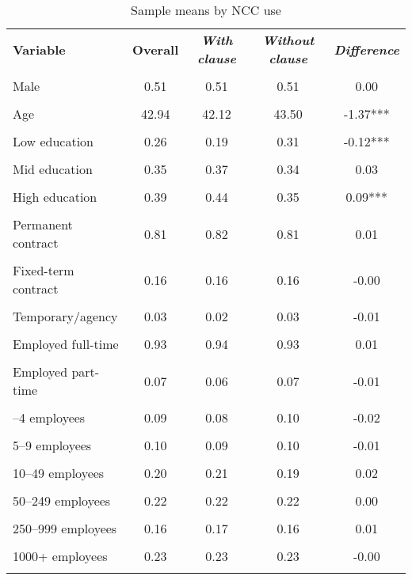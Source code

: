 \begin{table}[!ht]\centering
\caption{Sample means by NCC use}
\label{tab:sample_means_ncc_Portugal} %
\begin{tabular}{lcccc}\toprule
\textbf{Variable} & \textbf{Overall} & \textbf{\textit{With clause}} & \textbf{\textit{Without clause}} & \textbf{\textit{Difference}} \\\\ \midrule
Male & 0.51 & 0.51 & 0.51 & 0.00 \\\\
Age & 42.94 & 42.12 & 43.50 & -1.37*** \\\\
\addlinespace
Low education & 0.26 & 0.19 & 0.31 & -0.12*** \\\\
Mid education & 0.35 & 0.37 & 0.34 & 0.03 \\\\
High education & 0.39 & 0.44 & 0.35 & 0.09*** \\\\
\addlinespace
Permanent contract & 0.81 & 0.82 & 0.81 & 0.01 \\\\
Fixed-term contract & 0.16 & 0.16 & 0.16 & -0.00 \\\\
Temporary/agency & 0.03 & 0.02 & 0.03 & -0.01 \\\\
\addlinespace
Employed full-time & 0.93 & 0.94 & 0.93 & 0.01 \\\\
Employed part-time & 0.07 & 0.06 & 0.07 & -0.01 \\\\
\addlinespace
1–4 employees & 0.09 & 0.08 & 0.10 & -0.02 \\\\
5–9 employees & 0.10 & 0.09 & 0.10 & -0.01 \\\\
10–49 employees & 0.20 & 0.21 & 0.19 & 0.02 \\\\
50–249 employees & 0.22 & 0.22 & 0.22 & 0.00 \\\\
250–999 employees & 0.16 & 0.17 & 0.16 & 0.01 \\\\
1000+ employees & 0.23 & 0.23 & 0.23 & -0.00 \\\\
\bottomrule\end{tabular}\end{table}
